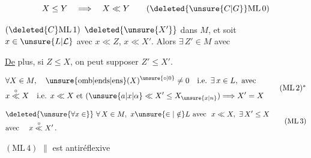 
\begingroup\makeatletter\tagsleft@true\makeatother
\[
 X\leq Y\quad\Longrightarrow\quad X\ll Y
 \tag*{$(\deleted{\unsure{C|G}}\mathrm{ML\,0})$}
\]

$(\deleted{C}\mathrm{ML\,1})$  $\deleted{\unsure{X'}}$
dans $M$, et soit $x\in\unsure{L|\mathcal L}$ avec $x\ll Z$, $x\ll X'$. Alors $\exists\,Z'\in M$ avec

\uline{De} plus, si $Z\leq X$, on peut supposer $Z'\leq X'$.

\[
\begin{aligned}
 &\forall X\in M,\quad \unsure{\mathrm{omb}|\mathrm{ends}|\mathrm{ens}}(X)^{\unsure{\circ|0}}\ne 0
   \quad\text{i.e. }\exists\,x\in L,\ \text{avec}\\
 &x\mathrel{\overset{\circ}{\ll}}X\quad\text{i.e. }x\ll X\text{ et }
   (\unsure{a|x|\alpha}\ll X'\leq X_{\unsure{x|n}})\Longrightarrow X'=X
\end{aligned}
\tag*{$(\mathrm{ML\,2})^{*}$}
\]

\[
\begin{aligned}
 &\deleted{\unsure{\forall x\in}}\ \forall\,X\in M,\ x\unsure{\in|\notin}L
    \ \text{avec }\ x\ll X,\ \exists\,X'\leq X\\
 &\text{avec }\quad x\mathrel{\overset{\circ}{\ll}}X'\,.
\end{aligned}
\tag*{$(\mathrm{ML\,3})$}
\]

$(\mathrm{ML\,4})$ $\parallel$ est  antiréflexive 

